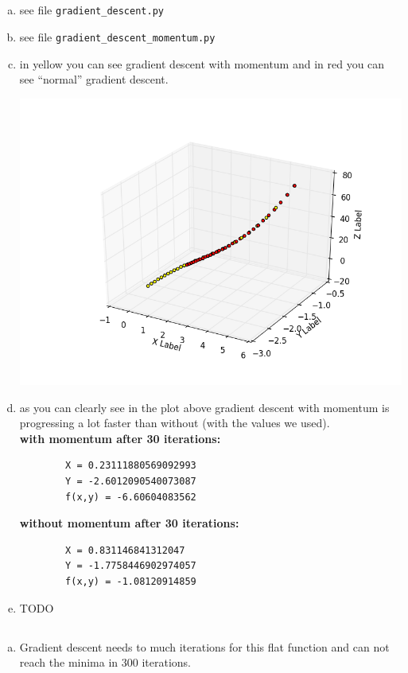 \documentclass[12pt]{article}
\begin{document}
\subsection{ }
\begin{enumerate}[a)]
    \item 
        see file \verb!gradient_descent.py!

    \item
        see file \verb!gradient_descent_momentum.py!

    \item
        in yellow you can see gradient descent with momentum and in red you can see ``normal'' gradient descent.\\
        \begin{center}
            \includegraphics[scale = 0.8]{pictures/figure_1}\\
        \end{center}

    \item
        as you can clearly see in the plot above gradient descent with momentum is progressing a lot faster than without (with the values we used).\\

        \textbf{with momentum after 30 iterations:}
        \begin{verbatim}
        X = 0.23111880569092993
        Y = -2.6012090540073087
        f(x,y) = -6.60604083562
        \end{verbatim}

        \textbf{without momentum after 30 iterations:}
        \begin{verbatim}
        X = 0.831146841312047
        Y = -1.7758446902974057
        f(x,y) = -1.08120914859
        \end{verbatim}

    \item
        TODO

\end{enumerate}


\subsection{}

\begin{enumerate}[a) ]
    \item 
        Gradient descent needs to much iterations for this flat function and can not reach the minima in 300 iterations.

\end{enumerate}
\end{document}
